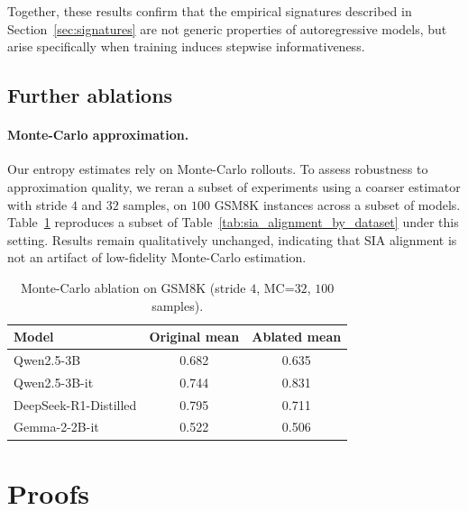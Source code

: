 \documentclass{article}
\begin{document}
Together, these results confirm that the empirical signatures described in Section~\ref{sec:signatures}
are not generic properties of autoregressive models, but arise specifically when training
induces stepwise informativeness.


\subsection{Further ablations}
\label{subsec:further_ablations}

\paragraph{Monte-Carlo approximation.}
Our entropy estimates rely on Monte-Carlo rollouts. To assess robustness to approximation quality, we reran a subset of experiments using a coarser estimator with stride $4$ and $32$ samples, on $100$ GSM8K instances across a subset of models. Table~\ref{tab:mc_ablation} reproduces a subset of Table~\ref{tab:sia_alignment_by_dataset} under this setting. Results remain qualitatively unchanged, indicating that SIA alignment is not an artifact of low-fidelity Monte-Carlo estimation.

\begin{table}[hbtp!]
\centering
\caption{Monte-Carlo ablation on GSM8K (stride $4$, MC=$32$, $100$ samples).}
\label{tab:mc_ablation}
\small
\begin{tabular}{lcc}
\toprule
\textbf{Model} & {Original mean} & {Ablated mean} \\
\midrule
Qwen2.5-3B      &  0.682 & 0.635 \\
Qwen2.5-3B-it   &  0.744 & 0.831 \\
DeepSeek-R1-Distilled    &  0.795 &  0.711 \\
Gemma-2-2B-it & 0.522 & 0.506 \\
\bottomrule
\end{tabular}
\end{table}

\onecolumn
\section{Proofs}
\label{app:proofs}
\end{document}
